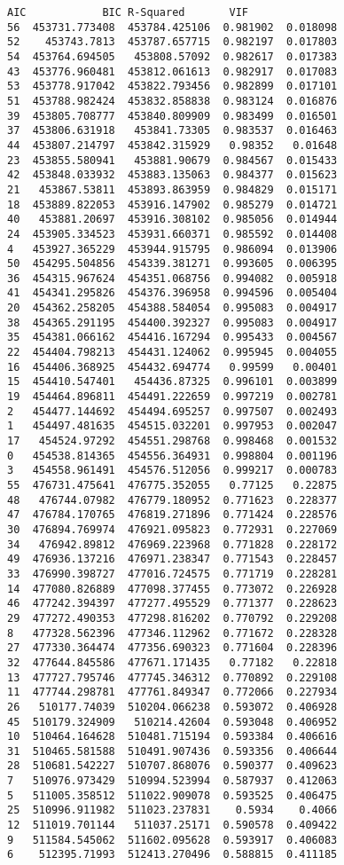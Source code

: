\documentclass[11pt]{article}
\begin{document}
\begin{tcolorbox}[breakable, size=fbox, boxrule=.5pt, pad at break*=1mm, opacityfill=0]
\begin{Verbatim}[commandchars=\\\{\}]
              AIC            BIC R-Squared       VIF
56  453731.773408  453784.425106  0.981902  0.018098
52    453743.7813  453787.657715  0.982197  0.017803
54  453764.694505   453808.57092  0.982617  0.017383
43  453776.960481  453812.061613  0.982917  0.017083
53  453778.917042  453822.793456  0.982899  0.017101
51  453788.982424  453832.858838  0.983124  0.016876
39  453805.708777  453840.809909  0.983499  0.016501
37  453806.631918   453841.73305  0.983537  0.016463
44  453807.214797  453842.315929   0.98352   0.01648
23  453855.580941   453881.90679  0.984567  0.015433
42  453848.033932  453883.135063  0.984377  0.015623
21   453867.53811  453893.863959  0.984829  0.015171
18  453889.822053  453916.147902  0.985279  0.014721
40   453881.20697  453916.308102  0.985056  0.014944
24  453905.334523  453931.660371  0.985592  0.014408
4   453927.365229  453944.915795  0.986094  0.013906
50  454295.504856  454339.381271  0.993605  0.006395
36  454315.967624  454351.068756  0.994082  0.005918
41  454341.295826  454376.396958  0.994596  0.005404
20  454362.258205  454388.584054  0.995083  0.004917
38  454365.291195  454400.392327  0.995083  0.004917
35  454381.066162  454416.167294  0.995433  0.004567
22  454404.798213  454431.124062  0.995945  0.004055
16  454406.368925  454432.694774   0.99599   0.00401
15  454410.547401   454436.87325  0.996101  0.003899
19  454464.896811  454491.222659  0.997219  0.002781
2   454477.144692  454494.695257  0.997507  0.002493
1   454497.481635  454515.032201  0.997953  0.002047
17   454524.97292  454551.298768  0.998468  0.001532
0   454538.814365  454556.364931  0.998804  0.001196
3   454558.961491  454576.512056  0.999217  0.000783
55  476731.475641  476775.352055   0.77125   0.22875
48   476744.07982  476779.180952  0.771623  0.228377
47  476784.170765  476819.271896  0.771424  0.228576
30  476894.769974  476921.095823  0.772931  0.227069
34   476942.89812  476969.223968  0.771828  0.228172
49  476936.137216  476971.238347  0.771543  0.228457
33  476990.398727  477016.724575  0.771719  0.228281
14  477080.826889  477098.377455  0.773072  0.226928
46  477242.394397  477277.495529  0.771377  0.228623
29  477272.490353  477298.816202  0.770792  0.229208
8   477328.562396  477346.112962  0.771672  0.228328
27  477330.364474  477356.690323  0.771604  0.228396
32  477644.845586  477671.171435   0.77182   0.22818
13  477727.795746  477745.346312  0.770892  0.229108
11  477744.298781  477761.849347  0.772066  0.227934
26   510177.74039  510204.066238  0.593072  0.406928
45  510179.324909   510214.42604  0.593048  0.406952
10  510464.164628  510481.715194  0.593384  0.406616
31  510465.581588  510491.907436  0.593356  0.406644
28  510681.542227  510707.868076  0.590377  0.409623
7   510976.973429  510994.523994  0.587937  0.412063
5   511005.358512  511022.909078  0.593525  0.406475
25  510996.911982  511023.237831    0.5934    0.4066
12  511019.701144   511037.25171  0.590578  0.409422
9   511584.545062  511602.095628  0.593917  0.406083
6    512395.71993  512413.270496  0.588815  0.411185
\end{Verbatim}
\end{tcolorbox}
        
\end{document}
